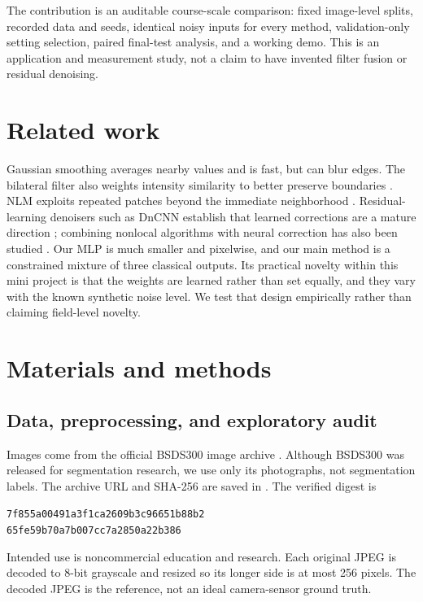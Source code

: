 \documentclass[11pt,a4paper]{article}
\begin{document}
The contribution is an auditable course-scale comparison: fixed image-level splits, recorded data and seeds, identical noisy inputs for every method, validation-only setting selection, paired final-test analysis, and a working demo. This is an application and measurement study, not a claim to have invented filter fusion or residual denoising.

\section{Related work}
Gaussian smoothing averages nearby values and is fast, but can blur edges. The bilateral filter also weights intensity similarity to better preserve boundaries \cite{tomasi1998}. NLM exploits repeated patches beyond the immediate neighborhood \cite{buades2005}. Residual-learning denoisers such as DnCNN establish that learned corrections are a mature direction \cite{zhang2017}; combining nonlocal algorithms with neural correction has also been studied \cite{guo2021}. Our MLP is much smaller and pixelwise, and our main method is a constrained mixture of three classical outputs. Its practical novelty within this mini project is that the weights are learned rather than set equally, and they vary with the known synthetic noise level. We test that design empirically rather than claiming field-level novelty.

\section{Materials and methods}
\subsection{Data, preprocessing, and exploratory audit}
Images come from the official BSDS300 image archive \cite{berkeley,martin2001}. Although BSDS300 was released for segmentation research, we use only its photographs, not segmentation labels. The archive URL and SHA-256 are saved in . The verified digest is
\begin{center}\small\texttt{7f855a00491a3f1ca2609b3c96651b88b2}\\\texttt{65fe59b70a7b007cc7a2850a22b386}\end{center}
Intended use is noncommercial education and research. Each original JPEG is decoded to 8-bit grayscale and resized so its longer side is at most 256 pixels. The decoded JPEG is the reference, not an ideal camera-sensor ground truth.
\end{document}
